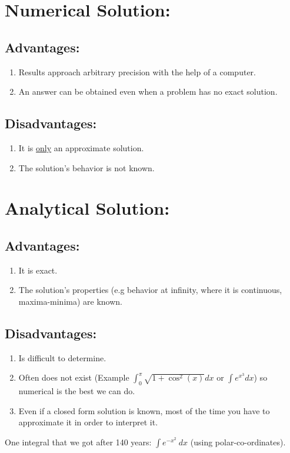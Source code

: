 \documentclass[]{article}
\begin{document}
\section*{Numerical Solution:}

\subsection*{Advantages:}

\begin{enumerate}
	\item Results approach arbitrary precision with the help of a computer.
	\item An answer can be obtained even when a problem has no exact solution.
\end{enumerate}

\subsection*{Disadvantages:}


\begin{enumerate}
	\item It is \underline{only} an approximate solution.
	\item The solution's behavior is not known.  
\end{enumerate}


\section*{Analytical Solution:}

\subsection*{Advantages:}

\begin{enumerate}
	\item It is exact.
	\item The solution's properties (e.g behavior at infinity, where it is continuous, maxima-minima) are known. 
\end{enumerate}

\subsection*{Disadvantages:}


\begin{enumerate}
	\item Is difficult to determine.
	\item Often does not exist (Example $ \displaystyle{\int_{0}^{\pi} \! \sqrt{1 + \cos^2(x)} dx} $ or $ \displaystyle{\int \! e^{x^3} dx}$) so numerical is the best we can do.
	\item Even if a closed form solution is known, most of the time you have to approximate it in order to interpret it. 
\end{enumerate}

One integral that we got after 140 years: $ \int \! e^{-x^2} \ dx$ (using polar-co-ordinates). 
\end{document}

